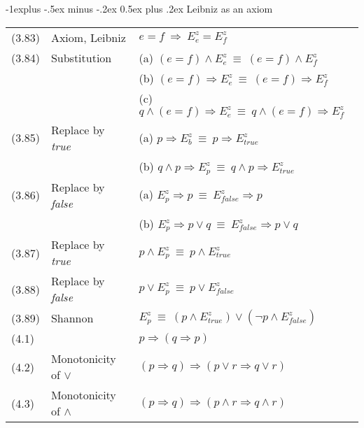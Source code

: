 \documentclass[letterpaper, 8pt]{extarticle}
\makeatletter
\renewcommand{\subsection}{\@startsection{subsection}{2}{0mm}%
                                {-1explus -.5ex minus -.2ex}%
                                {0.5ex plus .2ex}%
                                {\normalfont\small\bfseries}}
\newcommand{\To}{\Rightarrow}
\makeatother
\begin{document}
\begin{multicols*}{3}
    \subsection{Leibniz as an axiom}
    \begin{tabulary}{\linewidth}{@{}llL@{}}
        (3.83) & Axiom, Leibniz            & $e = f \ \To \ E_e^z = E_f^z$                                                         \\
        (3.84) & Substitution              & (a) $(e = f) \land E_e^z \ \equiv \ (e = f) \land E_f^z$                              \\
               &                           & (b) $(e = f) \To E_e^z \ \equiv \ (e = f) \To E_f^z$                                  \\
               &                           & (c) $q \land (e = f) \To E_e^z \ \equiv \ q \land (e = f) \To E_f^z$                  \\
        (3.85) & Replace by \textit{true}  & (a) $p \To E_b^z \ \equiv \ p \To E_\textit{true}^z$                                  \\
               &                           & (b) $q \land p \To E_p^z \ \equiv \ q \land p \To E_\textit{true}^z$                  \\
        (3.86) & Replace by \textit{false} & (a) $E_p^z \To p \ \equiv \ E_\textit{false}^z \To p$                                 \\
               &                           & (b) $E_p^z \To p \lor q \ \equiv \ E_\textit{false}^z \To p \lor q$                   \\
        (3.87) & Replace by \textit{true}  & $p \land E_p^z \ \equiv \ p \land E_\textit{true}^z$                                  \\
        (3.88) & Replace by \textit{false} & $p \lor E_p^z \ \equiv \ p \lor E_\textit{false}^z$                                   \\
        (3.89) & Shannon                   & $E_p^z \ \equiv \ (p \land E_\textit{true}^z) \lor (\neg p \land E_\textit{false}^z)$ \\
        (4.1)  &                           & $p \To (q \To p)$                                                                     \\
        (4.2)  & Monotonicity of $\lor$    & $(p \To q) \To (p \lor r \To q \lor r)$                                               \\
        (4.3)  & Monotonicity of $\land$   & $(p \To q) \To (p \land r \To q \land r)$                                             \\
    \end{tabulary}


\end{multicols*}
\end{document}
